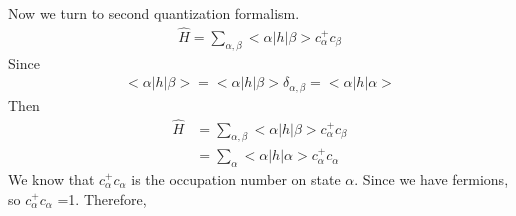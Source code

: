 \documentclass[a4paper]{article}
\begin{document}
Now we turn to second quantization formalism. 
\begin{align*}
	\hat H = \sum_{\alpha,\beta} <\alpha | h | \beta> c^{+}_{\alpha} c_{\beta}
\end{align*}
Since
\begin{align*}
	 <\alpha | h | \beta> =  <\alpha | h | \beta> \delta_{\alpha, \beta} = <\alpha | h | \alpha>
\end{align*}
Then
\begin{align*}
	\hat H & = \sum_{\alpha,\beta} <\alpha | h | \beta> c^{+}_{\alpha} c_{\beta} \\
		   & = 	\sum_{\alpha} <\alpha | h | \alpha> c^{+}_{\alpha} c_{\alpha}
\end{align*}
We know that $c^{+}_{\alpha} c_{\alpha}$ is the occupation number on state $\alpha$. Since we have fermions, so 
 $c^{+}_{\alpha} c_{\alpha}$ =1. Therefore,
\end{document}
